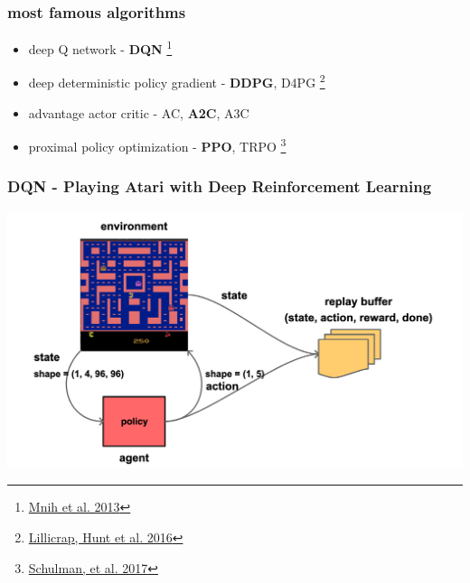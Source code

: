 \documentclass{beamer}
\begin{document}
\begin{frame}
  
  \frametitle{most famous algorithms} 

  \begin{itemize}
    \item deep Q network - {\bf DQN} \footnote{\href{https://arxiv.org/pdf/1312.5602.pdf}{Mnih et al. 2013}}
    \item deep deterministic policy gradient - {\bf DDPG}, D4PG \footnote{\href{https://arxiv.org/pdf/1509.02971.pdf}{Lillicrap, Hunt et al. 2016}}
    \item advantage actor critic - AC, {\bf A2C}, A3C
    \item proximal policy optimization - {\bf PPO}, TRPO \footnote{\href{https://arxiv.org/pdf/1707.06347.pdf}{Schulman, et al. 2017}}
  \end{itemize}

\end{frame}


\begin{frame}
  \frametitle{DQN - Playing Atari with Deep Reinforcement Learning} 

  \centering
  \includegraphics[scale=0.18]{../diagrams/basic/dqn1.png}
\end{frame}
\end{document}
